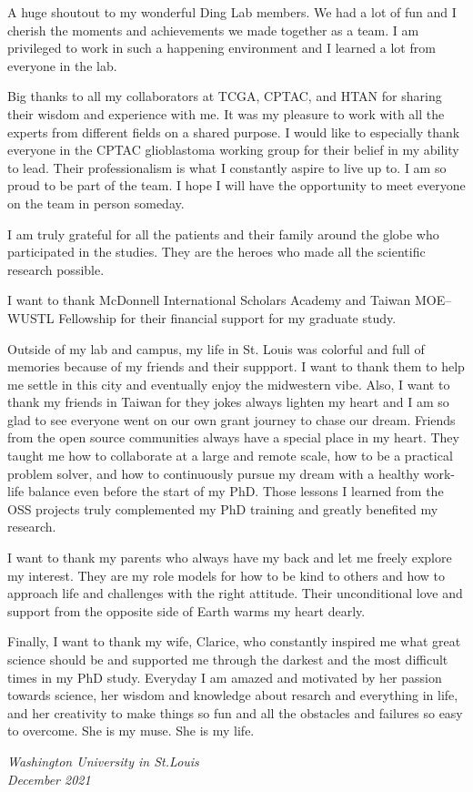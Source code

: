 A huge shoutout to my wonderful Ding Lab members.
We had a lot of fun and I cherish the moments and achievements we made together as a team.
I am privileged to work in such a happening environment and I learned a lot from everyone in the lab.

Big thanks to all my collaborators at TCGA, CPTAC, and HTAN for sharing their wisdom and experience with me.
It was my pleasure to work with all the experts from different fields on a shared purpose.
I would like to especially thank everyone in the CPTAC glioblastoma working group for their belief in my ability to lead.
Their professionalism is what I constantly aspire to live up to.
I am so proud to be part of the team.
I hope I will have the opportunity to meet everyone on the team in person someday.

I am truly grateful for all the patients and their family around the globe who participated in the studies.
They are the heroes who made all the scientific research possible.

I want to thank McDonnell International Scholars Academy and Taiwan MOE--WUSTL Fellowship for their financial support for my graduate study.

Outside of my lab and campus, my life in St. Louis was colorful and full of memories because of my friends and their suppport.
I want to thank them to help me settle in this city and eventually enjoy the midwestern vibe.
Also, I want to thank my friends in Taiwan for they jokes always lighten my heart and I am so glad to see everyone went on our own grant journey to chase our dream.
Friends from the open source communities always have a special place in my heart.
They taught me how to collaborate at a large and remote scale, how to be a practical problem solver, and how to continuously pursue my dream with a healthy work-life balance even before the start of my PhD.
Those lessons I learned from the OSS projects truly complemented my PhD training and greatly benefited my research.

I want to thank my parents who always have my back and let me freely explore my interest.
They are my role models for how to be kind to others and how to approach life and challenges with the right attitude.
Their unconditional love and support from the opposite side of Earth warms my heart dearly.

Finally, I want to thank my wife, Clarice, who constantly inspired me what great science should be and supported me through the darkest and the most difficult times in my PhD study.
Everyday I am amazed and motivated by her passion towards science, her wisdom and knowledge about resarch and everything in life, and her creativity to make things so fun and all the obstacles and failures so easy to overcome.
She is my muse.
She is my life.

\null\hfill \thesisauthor

\noindent
\textit{Washington University in St.\@ Louis}\\
\textit{December 2021}
